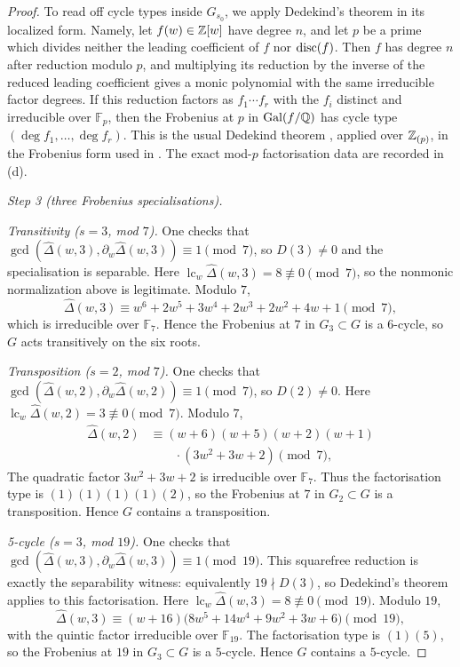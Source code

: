 \begin{proof}
To read off cycle types inside \(G_{s_0}\), we apply Dedekind's
theorem in its localized form. Namely, let
\(f(w)\in\mathbb{Z}[w]\) have degree \(n\), and let \(p\) be a prime
which divides neither the leading coefficient of \(f\) nor
\(\operatorname{disc}(f)\). Then \(f\) has degree \(n\) after reduction modulo
\(p\), and multiplying its reduction by the inverse of the reduced
leading coefficient gives a monic polynomial with the same irreducible
factor degrees. If this reduction factors as
\(f_1\cdots f_r\) with the \(f_i\) distinct and irreducible over
\(\mathbb{F}_p\), then the Frobenius at \(p\) in \(\operatorname{Gal}(f/\mathbb{Q})\)
has cycle type \((\deg f_1,\dots,\deg f_r)\). This is the usual
Dedekind theorem \cite[I, \S{}6, Proposition~25]{Serre1979}, applied
over \(\mathbb{Z}_{(p)}\), in the Frobenius form used in
\cite[\S{}4.3]{Serre2008Topics}. The exact mod-\(p\) factorisation
data are recorded in \,(d).

\medskip
\noindent\textit{Step 3 (three Frobenius specialisations).}

\smallskip
\noindent\textit{Transitivity (\(s=3\), mod \(7\)).}\quad
One checks that
\(\gcd(\widehat\Delta(w,3),\partial_w\widehat\Delta(w,3))\equiv 1\pmod 7\),
so \(D(3)\neq 0\) and the specialisation is separable.
Here \(\operatorname{lc}_w\widehat\Delta(w,3)=8\not\equiv0\pmod7\),
so the nonmonic normalization above is legitimate.
Modulo \(7\),
\[
  \widehat\Delta(w,3)
  \equiv w^6+2w^5+3w^4+2w^3+2w^2+4w+1\pmod 7,
\]
which is irreducible over \(\mathbb{F}_7\). Hence the Frobenius at \(7\)
in \(G_3\subset G\) is a \(6\)-cycle, so \(G\) acts transitively
on the six roots.

\smallskip
\noindent\textit{Transposition (\(s=2\), mod \(7\)).}\quad
One checks that
\(\gcd(\widehat\Delta(w,2),\partial_w\widehat\Delta(w,2))\equiv 1\pmod 7\),
so \(D(2)\neq 0\). Here
\(\operatorname{lc}_w\widehat\Delta(w,2)=3\not\equiv0\pmod7\).
Modulo \(7\),
\[
\begin{aligned}
  \widehat\Delta(w,2)
  &\equiv (w+6)(w+5)(w+2)(w+1) \\
  &\qquad\cdot(3w^2+3w+2)\pmod 7,
\end{aligned}
\]
The quadratic factor \(3w^2+3w+2\) is irreducible over
\(\mathbb{F}_7\). Thus the factorisation type is
\((1)(1)(1)(1)(2)\), so the Frobenius at \(7\) in \(G_2\subset G\) is a
transposition. Hence \(G\) contains a transposition.

\smallskip
\noindent\textit{5-cycle (\(s=3\), mod \(19\)).}\quad
One checks that
\(\gcd(\widehat\Delta(w,3),\partial_w\widehat\Delta(w,3))\equiv 1\pmod{19}\).
This squarefree reduction is exactly the separability witness:
equivalently \(19\nmid D(3)\), so Dedekind's theorem applies to this
factorisation.
Here \(\operatorname{lc}_w\widehat\Delta(w,3)=8\not\equiv0\pmod{19}\).
Modulo \(19\),
\[
  \widehat\Delta(w,3)
  \equiv (w+16)\bigl(8w^5+14w^4+9w^2+3w+6\bigr)\pmod{19},
\]
with the quintic factor irreducible over \(\mathbb{F}_{19}\). The
factorisation type is \((1)(5)\), so the Frobenius at \(19\) in
\(G_3\subset G\) is a \(5\)-cycle. Hence \(G\) contains a
\(5\)-cycle.


\end{proof}
